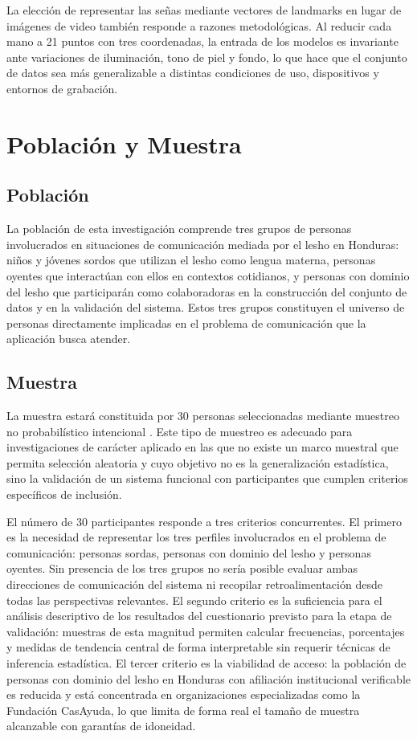 La elección de representar las señas mediante vectores de landmarks en lugar de imágenes
de video también responde a razones metodológicas. Al reducir cada mano a 21 puntos con
tres coordenadas, la entrada de los modelos es invariante ante variaciones de
iluminación, tono de piel y fondo, lo que hace que el conjunto de datos sea más
generalizable a distintas condiciones de uso, dispositivos y entornos de grabación.

\section{Población y Muestra}

\subsection{Población}

La población de esta investigación comprende tres grupos de personas involucrados en
situaciones de comunicación mediada por el \acrshort{lesho} en Honduras: niños y jóvenes
sordos que utilizan el \acrshort{lesho} como lengua materna, personas oyentes que interactúan
con ellos en contextos cotidianos, y personas con dominio del \acrshort{lesho} que participarán
como colaboradoras en la construcción del conjunto de datos y en la validación del
sistema. Estos tres grupos constituyen el universo de personas directamente implicadas
en el problema de comunicación que la aplicación busca atender.

\subsection{Muestra}

La muestra estará constituida por 30 personas seleccionadas mediante muestreo no
probabilístico intencional \cite{sampieri_metodologia_2014}. Este tipo de muestreo es
adecuado para investigaciones de carácter aplicado en las que no existe un marco
muestral que permita selección aleatoria y cuyo objetivo no es la generalización
estadística, sino la validación de un sistema funcional con participantes que cumplen
criterios específicos de inclusión.

El número de 30 participantes responde a tres criterios concurrentes. El primero es la
necesidad de representar los tres perfiles involucrados en el problema de comunicación:
personas sordas, personas con dominio del \acrshort{lesho} y personas oyentes. Sin presencia de
los tres grupos no sería posible evaluar ambas direcciones de comunicación del sistema
ni recopilar retroalimentación desde todas las perspectivas relevantes. El segundo
criterio es la suficiencia para el análisis descriptivo de los resultados del
cuestionario previsto para la etapa de validación: muestras de esta magnitud permiten
calcular frecuencias, porcentajes y medidas de tendencia central de forma interpretable
sin requerir técnicas de inferencia estadística. El tercer criterio es la viabilidad
de acceso: la población de personas con dominio del \acrshort{lesho} en Honduras con afiliación
institucional verificable es reducida y está concentrada en organizaciones especializadas
como la Fundación CasAyuda, lo que limita de forma real el tamaño de muestra
alcanzable con garantías de idoneidad.

